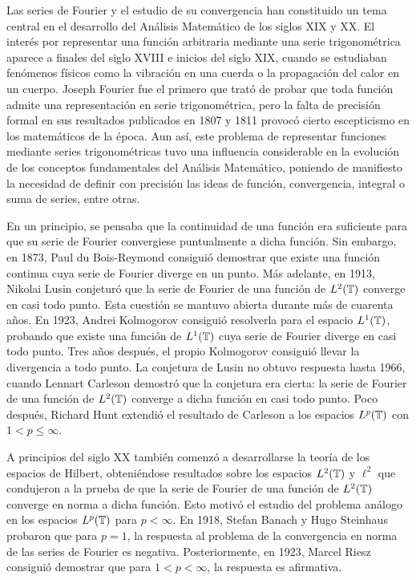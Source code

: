 \documentclass[a4paper, 12pt]{book}
\begin{document}
Las series de Fourier y el estudio de su convergencia han constituido un tema central en el desarrollo del Análisis Matemático de los siglos XIX y XX. El interés por representar una función arbitraria mediante una serie trigonométrica aparece a finales del siglo XVIII e inicios del siglo XIX, cuando se estudiaban fenómenos físicos como la vibración en una cuerda o la propagación del calor en un cuerpo. Joseph Fourier fue el primero que trató de probar que toda función admite una representación en serie trigonométrica, pero la falta de precisión formal en sus resultados publicados en 1807 y 1811 provocó cierto escepticismo en los matemáticos de la época. Aun así, este problema de representar funciones mediante series trigonométricas tuvo una influencia considerable en la evolución de los conceptos fundamentales del Análisis Matemático, poniendo de manifiesto la necesidad de definir con precisión las ideas de función, convergencia, integral o suma de series, entre otras.

En un principio, se pensaba que la continuidad de una función era suficiente para que su serie de Fourier convergiese puntualmente a dicha función. Sin embargo, en 1873, Paul du Bois-Reymond consiguió demostrar que existe una función continua cuya serie de Fourier diverge en un punto. Más adelante, en 1913, Nikolai Lusin conjeturó que la serie de Fourier de una función de $L^2(\mathbb T)$ converge en casi todo punto. Esta cuestión se mantuvo abierta durante más de cuarenta años. En 1923, Andrei Kolmogorov consiguió resolverla para el espacio $L^1(\mathbb T)$, probando que existe una función de $L^1(\mathbb T)$ cuya serie de Fourier diverge en casi todo punto. Tres años después, el propio Kolmogorov consiguió llevar la divergencia a todo punto. La conjetura de Lusin no obtuvo respuesta hasta 1966, cuando Lennart Carleson demostró que la conjetura era cierta: la serie de Fourier de una función de $L^2(\mathbb T)$ converge a dicha función en casi todo punto. Poco después, Richard Hunt extendió el resultado de Carleson a los espacios $L^p(\mathbb T)$ con $1 < p \leq \infty$.

A principios del siglo XX también comenzó a desarrollarse la teoría de los espacios de Hilbert, obteniéndose resultados sobre los espacios $L^2(\mathbb T)$ y $\ell^2$ que condujeron a la prueba de que la serie de Fourier de una función de $L^2(\mathbb T)$ converge en norma a dicha función. Esto motivó el estudio del problema análogo en los espacios $L^p(\mathbb T)$ para $p < \infty$. En 1918, Stefan Banach y Hugo Steinhaus probaron que para $p = 1$, la respuesta al problema de la convergencia en norma de las series de Fourier es negativa. Posteriormente, en 1923, Marcel Riesz consiguió demostrar que para $1 <p < \infty$, la respuesta es afirmativa.
\end{document}
